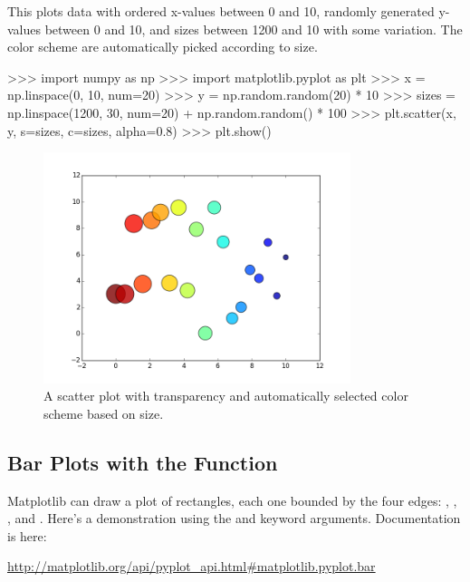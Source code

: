 \documentclass[11pt]{cselabheader}
\begin{document}
This plots data with ordered x-values between 0 and 10, randomly generated
y-values between 0 and 10, and sizes between 1200 and 10 with some variation.
The color scheme are automatically picked according to size.

\begin{pyconcode}
>>> import numpy as np
>>> import matplotlib.pyplot as plt
>>> x = np.linspace(0, 10, num=20)
>>> y = np.random.random(20) * 10
>>> sizes = np.linspace(1200, 30, num=20) + np.random.random() * 100
>>> plt.scatter(x, y, s=sizes, c=sizes, alpha=0.8)
>>> plt.show()
\end{pyconcode}

\begin{figure}[H]
  \centering
  \includegraphics[width=0.8\textwidth]{img/matplotlib_scatter.png}
  \caption{A scatter plot with transparency and automatically selected color
scheme based on size.}
\end{figure}

\subsection{Bar Plots with the  Function}

Matplotlib can draw a plot of rectangles, each one bounded by the four edges:
, , , and
. Here's a demonstration using the
 and  keyword arguments.
Documentation is here:

\begin{center}
\url{http://matplotlib.org/api/pyplot_api.html#matplotlib.pyplot.bar}
\end{center}
\end{document}
